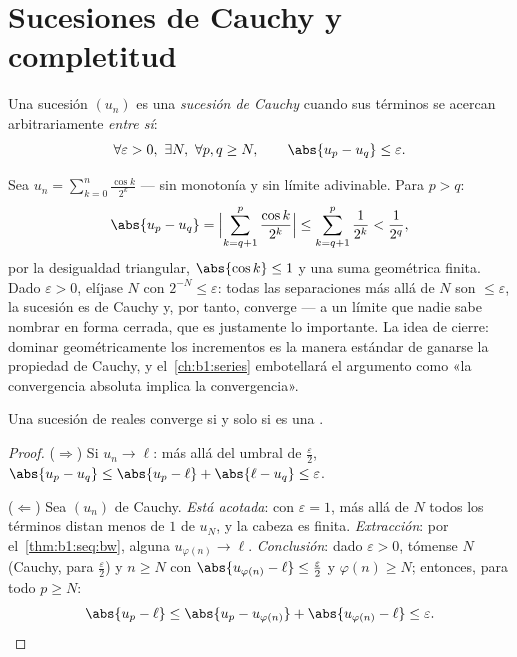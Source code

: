 \section{Sucesiones de Cauchy y completitud}

\begin{definition}\label{def:b1:seq:cauchy}
Una sucesión $(u_n)$ es una \emph{sucesión de
Cauchy} cuando sus términos se acercan
arbitrariamente \emph{entre sí}:
\[
\forall \varepsilon > 0,\ \exists N,\ \forall p, q \geq N,
\qquad \abs{u_p - u_q} \leq \varepsilon .
\]
\end{definition}

\begin{example}\label{ex:b1:seq:cauchyhand}
Sea $u_n = \sum_{k=0}^{n} \frac{\cos k}{2^k}$ --- sin monotonía y sin
límite adivinable. Para $p > q$:
\[
\abs{u_p - u_q}
= \Bigl| \sum_{k=q+1}^{p} \frac{\cos k}{2^k} \Bigr|
\leq \sum_{k=q+1}^{p} \frac{1}{2^k}
< \frac{1}{2^{q}} ,
\]
por la desigualdad triangular, $\abs{\cos k} \leq 1$ y una suma
geométrica finita. Dado $\varepsilon > 0$, elíjase $N$ con
$2^{-N} \leq \varepsilon$: todas las separaciones más allá de $N$ son
$\leq \varepsilon$, la sucesión es de Cauchy y, por tanto, converge
--- a un límite que nadie sabe nombrar en forma cerrada, que es
justamente lo importante. La idea de cierre: dominar geométricamente
los incrementos es la manera estándar de ganarse la propiedad de
Cauchy, y el~\cref{ch:b1:series} embotellará el argumento como «la
convergencia absoluta implica la convergencia».
\end{example}

\begin{theorem}[Completitud de $\R$]\label{thm:b1:seq:complete}
Una sucesión de reales converge si y solo si es una .
\end{theorem}

\begin{proof}
($\Rightarrow$) Si $u_n \to \ell$: más allá del umbral de
$\frac\varepsilon2$, $\abs{u_p - u_q} \leq \abs{u_p - \ell} +
\abs{\ell - u_q} \leq \varepsilon$.

($\Leftarrow$) Sea $(u_n)$ de Cauchy. \emph{Está acotada}: con
$\varepsilon = 1$, más allá de $N$ todos los términos distan menos de
$1$ de $u_N$, y la cabeza es finita. \emph{Extracción}: por
el~\cref{thm:b1:seq:bw}, alguna  $u_{\varphi(n)} \to \ell$.
\emph{Conclusión}: dado $\varepsilon > 0$, tómense $N$ (Cauchy, para
$\frac\varepsilon2$) y $n \geq N$ con $\abs{u_{\varphi(n)} - \ell}
\leq \frac\varepsilon2$ y $\varphi(n) \geq N$; entonces, para todo
$p \geq N$:
\[
\abs{u_p - \ell} \leq \abs{u_p - u_{\varphi(n)}} +
\abs{u_{\varphi(n)} - \ell} \leq \varepsilon . \qedhere
\]
\end{proof}

